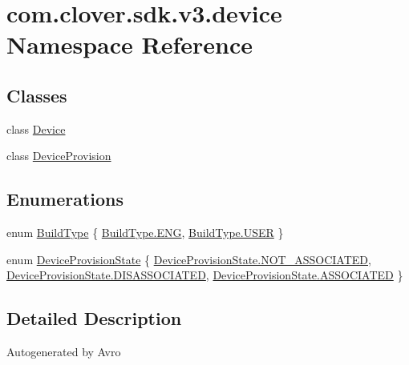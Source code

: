 \hypertarget{namespacecom_1_1clover_1_1sdk_1_1v3_1_1device}{}\section{com.\+clover.\+sdk.\+v3.\+device Namespace Reference}
\label{namespacecom_1_1clover_1_1sdk_1_1v3_1_1device}
\subsection*{Classes}
\begin{DoxyCompactItemize}
\item 
class \hyperlink{classcom_1_1clover_1_1sdk_1_1v3_1_1device_1_1_device}{Device}
\item 
class \hyperlink{classcom_1_1clover_1_1sdk_1_1v3_1_1device_1_1_device_provision}{Device\+Provision}
\end{DoxyCompactItemize}
\subsection*{Enumerations}
\begin{DoxyCompactItemize}
\item 
enum \hyperlink{namespacecom_1_1clover_1_1sdk_1_1v3_1_1device_a8dd97d0ddba1e91704a7c44c7d27eb85}{Build\+Type} \{ \hyperlink{namespacecom_1_1clover_1_1sdk_1_1v3_1_1device_a8dd97d0ddba1e91704a7c44c7d27eb85a6f79eb95af0de3bf64b49b29765a86b3}{Build\+Type.\+E\+NG}, 
\hyperlink{namespacecom_1_1clover_1_1sdk_1_1v3_1_1device_a8dd97d0ddba1e91704a7c44c7d27eb85a2e40ad879e955201df4dedbf8d479a12}{Build\+Type.\+U\+S\+ER}
 \}
\item 
enum \hyperlink{namespacecom_1_1clover_1_1sdk_1_1v3_1_1device_a91531b18ad063f2ee84a585d774b2d56}{Device\+Provision\+State} \{ \hyperlink{namespacecom_1_1clover_1_1sdk_1_1v3_1_1device_a91531b18ad063f2ee84a585d774b2d56a3ea2c7920d381fde2cdfaff4a8be6dc0}{Device\+Provision\+State.\+N\+O\+T\+\_\+\+A\+S\+S\+O\+C\+I\+A\+T\+ED}, 
\hyperlink{namespacecom_1_1clover_1_1sdk_1_1v3_1_1device_a91531b18ad063f2ee84a585d774b2d56a7302b74573f3c11d882a261684c4cc11}{Device\+Provision\+State.\+D\+I\+S\+A\+S\+S\+O\+C\+I\+A\+T\+ED}, 
\hyperlink{namespacecom_1_1clover_1_1sdk_1_1v3_1_1device_a91531b18ad063f2ee84a585d774b2d56aee8390da0906b3e297d8f30e7741fbf0}{Device\+Provision\+State.\+A\+S\+S\+O\+C\+I\+A\+T\+ED}
 \}
\end{DoxyCompactItemize}


\subsection{Detailed Description}
Autogenerated by Avro

